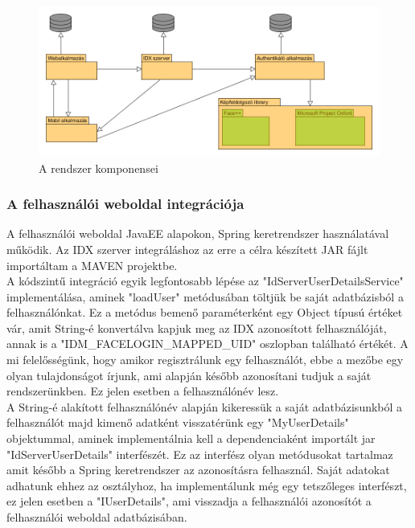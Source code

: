 \begin{figure}[h]
 \begin{minipage}{1\textwidth} 
\centering
    \includegraphics[scale=0.47]{img/rendszerkomponensek}
    \caption{A rendszer komponensei}
 \end{minipage}
\end{figure}


\subsubsection{A felhasználói weboldal integrációja}

A felhasználói weboldal JavaEE alapokon, Spring keretrendszer használatával működik. Az IDX szerver integráláshoz az erre a célra készített JAR fájlt importáltam a MAVEN projektbe.
\\
A kódszintű integráció egyik legfontosabb lépése az "IdServerUserDetailsService" implementálása, aminek "loadUser" metódusában töltjük be saját adatbázisból a felhasználónkat. Ez a metódus bemenő paraméterként egy Object típusú értéket vár, amit String-é konvertálva kapjuk meg az IDX azonosított felhasználóját, annak is a "IDM\_FACELOGIN\_MAPPED\_UID" oszlopban található értékét. A mi felelősségünk, hogy amikor regisztrálunk egy felhasználót, ebbe a mezőbe egy olyan tulajdonságot írjunk, ami alapján később azonosítani tudjuk a saját rendszerünkben. Ez jelen esetben a felhasználónév lesz.
\\A String-é alakított felhasználónév alapján kikeressük a saját adatbázisunkból a felhasználót majd kimenő adatként visszatérünk egy "MyUserDetails" objektummal, aminek implementálnia kell a dependenciaként importált jar "IdServerUserDetails" interfészét. Ez az interfész olyan metódusokat tartalmaz amit később a Spring keretrendszer az azonosításra felhasznál. Saját adatokat adhatunk ehhez az osztályhoz, ha implementálunk még egy tetszőleges interfészt, ez jelen esetben a "IUserDetails", ami visszadja a felhasználói azonosítót a felhasználói weboldal adatbázisában.

